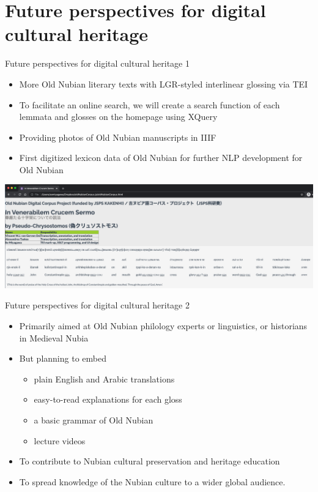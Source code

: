 \documentclass{beamer}
\begin{document}
\section{Future perspectives for digital cultural heritage}

\begin{frame}{Future perspectives for digital cultural heritage 1}
   \begin{itemize}
      \item More Old Nubian literary texts with LGR-styled interlinear glossing via TEI 
      \item To facilitate an online search, we will create a search function of each lemmata and 
      glosses on the homepage using XQuery
      \item Providing photos of Old Nubian manuscripts in IIIF
      \item First digitized lexicon data of Old Nubian for further NLP development for Old Nubian
   \end{itemize}
\begin{center}
\includegraphics[width=1.0\textwidth]{webcorpus2.png}
\end{center}

\end{frame}

\begin{frame}{Future perspectives for digital cultural heritage 2}
    \begin{itemize}
      \item Primarily aimed at Old Nubian philology experts or linguistics, or historians in 
      Medieval Nubia 
      \item But planning to embed 
      \begin{itemize}
        \item plain English and Arabic translations
        \item easy-to-read explanations for each gloss
        \item a basic grammar of Old Nubian
        \item lecture videos
      \end{itemize}
      \item To contribute to Nubian cultural preservation and heritage education 
      \item To spread knowledge of the Nubian culture to a wider global audience.
   \end{itemize}
\end{frame}
\end{document}
